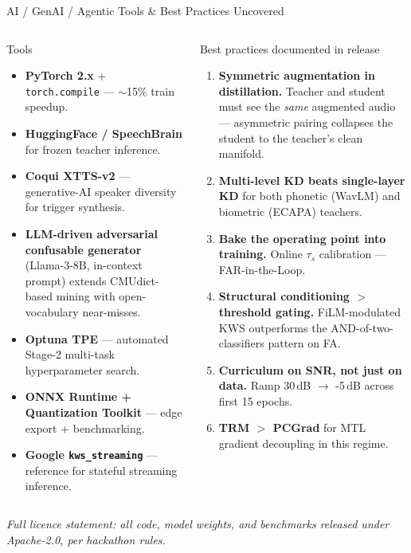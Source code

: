 \documentclass[aspectratio=169,10pt]{beamer}
\begin{document}
\begin{frame}{AI / GenAI / Agentic Tools \& Best Practices Uncovered}
  \small
  \begin{columns}[T, onlytextwidth]
      \begin{block}{\color{sriblue}Tools}
        \begin{itemize}\setlength\itemsep{2pt}
          \item \textbf{PyTorch 2.x} + \texttt{torch.compile} — $\sim$15\% train speedup.
          \item \textbf{HuggingFace / SpeechBrain} for frozen teacher inference.
          \item \textbf{Coqui XTTS-v2} — generative-AI speaker diversity for trigger synthesis.
          \item \textbf{LLM-driven adversarial confusable generator} (Llama-3-8B, in-context prompt) extends CMUdict-based mining with open-vocabulary near-misses.
          \item \textbf{Optuna TPE} — automated Stage-2 multi-task hyperparameter search.
          \item \textbf{ONNX Runtime + Quantization Toolkit} — edge export + benchmarking.
          \item \textbf{Google \texttt{kws\_streaming}} — reference for stateful streaming inference.
        \end{itemize}
      \end{block}
      \begin{block}{\color{srigold}Best practices documented in release}
        \begin{enumerate}\setlength\itemsep{2pt}
          \item \textbf{Symmetric augmentation in distillation.} Teacher and student must see the \emph{same} augmented audio — asymmetric pairing collapses the student to the teacher's clean manifold.
          \item \textbf{Multi-level KD beats single-layer KD} for both phonetic (WavLM) and biometric (ECAPA) teachers.
          \item \textbf{Bake the operating point into training.} Online $\tau_s$ calibration — FAR-in-the-Loop.
          \item \textbf{Structural conditioning $>$ threshold gating.} FiLM-modulated KWS outperforms the AND-of-two-classifiers pattern on FA.
          \item \textbf{Curriculum on SNR, not just on data.} Ramp 30\,dB $\to$ -5\,dB across first 15 epochs.
          \item \textbf{TRM $>$ PCGrad} for MTL gradient decoupling in this regime.
        \end{enumerate}
      \end{block}
  \end{columns}
  \vspace{0.2em}
  \centering
  \small\color{srigray}\textit{Full licence statement: all code, model weights, and benchmarks released under Apache-2.0, per hackathon rules.}
\end{frame}
\end{document}
